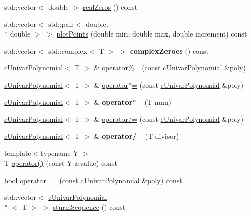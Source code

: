 \begin{DoxyCompactItemize}
\item 
std\-::vector$<$ double $>$ \hyperlink{classcUnivarPolynomial_a0d81e941a048c6ca649dd11d8a4cda8b}{real\-Zeros} () const 
\item 
std\-::vector$<$ std\-::pair$<$ double, \\*
double $>$ $>$ \hyperlink{classcUnivarPolynomial_abd186b4aab94bf19bf33796df810785e}{plot\-Points} (double min, double max, double increment) const 
\item 
\hypertarget{classcUnivarPolynomial_a43462afe158c1ee0f24633521de68615}{std\-::vector$<$ std\-::complex$<$ T $>$ $>$ {\bfseries complex\-Zeroes} () const }\label{classcUnivarPolynomial_a43462afe158c1ee0f24633521de68615}

\item 
\hyperlink{classcUnivarPolynomial}{c\-Univar\-Polynomial}$<$ T $>$ \& \hyperlink{classcUnivarPolynomial_a3aeaae886ae33ff00e9207847c68deb2}{operator\%=} (const \hyperlink{classcUnivarPolynomial}{c\-Univar\-Polynomial} \&poly)
\item 
\hyperlink{classcUnivarPolynomial}{c\-Univar\-Polynomial}$<$ T $>$ \& \hyperlink{classcUnivarPolynomial_a4158585d1768e886c6802030f6ec128f}{operator$\ast$=} (const \hyperlink{classcUnivarPolynomial}{c\-Univar\-Polynomial} \&poly)
\item 
\hypertarget{classcUnivarPolynomial_a835d683a23b47a5bd9c1958f1f8bf814}{\hyperlink{classcUnivarPolynomial}{c\-Univar\-Polynomial}$<$ T $>$ \& {\bfseries operator$\ast$=} (T num)}\label{classcUnivarPolynomial_a835d683a23b47a5bd9c1958f1f8bf814}

\item 
\hyperlink{classcUnivarPolynomial}{c\-Univar\-Polynomial}$<$ T $>$ \& \hyperlink{classcUnivarPolynomial_a60558f674dbadb2d18e3406f4d45da0e}{operator/=} (const \hyperlink{classcUnivarPolynomial}{c\-Univar\-Polynomial} \&poly)
\item 
\hypertarget{classcUnivarPolynomial_ab638a1b793b4f96315899672e77af6e5}{\hyperlink{classcUnivarPolynomial}{c\-Univar\-Polynomial}$<$ T $>$ \& {\bfseries operator/=} (T divisor)}\label{classcUnivarPolynomial_ab638a1b793b4f96315899672e77af6e5}

\item 
{\footnotesize template$<$typename Y $>$ }\\T \hyperlink{classcUnivarPolynomial_a651a710f52fdd21136419d2c6fef5574}{operator()} (const Y \&value) const 
\item 
bool \hyperlink{classcUnivarPolynomial_a54e506b4fac4647cc8aad776ba131940}{operator==} (const \hyperlink{classcUnivarPolynomial}{c\-Univar\-Polynomial} \&poly) const 
\item 
std\-::vector$<$ \hyperlink{classcUnivarPolynomial}{c\-Univar\-Polynomial}\\*
$<$ T $>$ $>$ \hyperlink{classcUnivarPolynomial_a936aa1a9e68b7005af72be0fbb2d91ac}{sturm\-Sequence} () const 
\end{DoxyCompactItemize}
